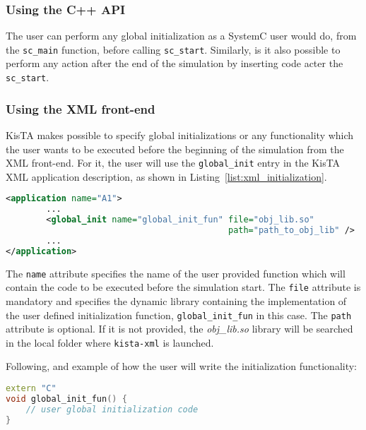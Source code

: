 

\subsubsection{Using the C++ API}
\label{sec:app_initialization_cpp_api}

    The user can perform any global initialization as a SystemC user would do, from the \texttt{sc\_main} function, before calling \texttt{sc\_start}.
Similarly, is it also possible to perform any action after the end of the simulation by inserting code acter the \texttt{sc\_start}.

\subsubsection{Using the XML front-end}
\label{sec:app_initialization_xml}

KisTA makes possible to specify global initializations or any functionality which the user wants to be executed before the beginning of the simulation
from the XML front-end.
%
For it, the user will use the \texttt{global\_init} entry in the KisTA XML application description, as shown in Listing~\ref{list:xml_initialization}.

\begin{lstlisting}[language=XML, caption={Setting a global init functionality from the XML frontend.}, label=list:xml_initialization]
<application name="A1">
        ...
        <global_init name="global_init_fun" file="obj_lib.so"
                                            path="path_to_obj_lib" />
        ...
</application>
\end{lstlisting}


The \texttt{name} attribute specifies the name of the user provided function which will contain the code to be executed before the simulation start.
The \texttt{file} attribute is mandatory and specifies the dynamic library containing the implementation of the user defined initialization function, \texttt{global\_init\_fun} in this case.
The \texttt{path} attribute is optional. If it is not provided, the \emph{obj\_lib.so} library will be searched in the local folder where \texttt{kista-xml} is launched.

Following, and example of how the user will write the initialization functionality:

\begin{lstlisting}[language=c++,caption={Example of initial functionality, specified from the XML front-end to be executed before simulation start.}]
extern "C"
void global_init_fun() {
    // user global initialization code
}
\end{lstlisting}

